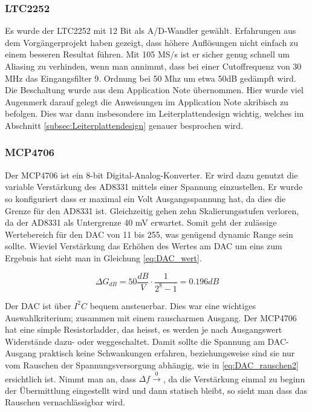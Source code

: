 \subsubsection{LTC2252}
Es wurde der LTC2252\cite{LTC2252} mit 12 Bit als A/D-Wandler gewählt. Erfahrungen aus dem Vorgängerprojekt haben gezeigt, dass höhere Auflösungen nicht einfach zu einem besseren Resultat führen. %
Mit 105 MS/s ist er sicher genug schnell um Aliasing zu verhinden, wenn man annimmt, dass bei einer Cutoffrequenz von 30 MHz das Eingangsfilter 9. Ordnung bei 50 Mhz um etwa 50dB gedämpft wird.
Die Beschaltung wurde aus dem Application Note übernommen. Hier wurde viel Augenmerk darauf gelegt die Anweisungen im Application Note akribisch zu befolgen. Dies war dann insbesondere im Leiterplattendesign wichtig, welches im Abschnitt \ref{subsec:Leiterplattendesign} genauer besprochen wird.

\subsubsection{MCP4706}
\label{subsec:MCP4706}
Der MCP4706\cite{MCP4706} ist ein 8-bit Digital-Analog-Konverter. Er wird dazu genutzt die variable Verstärkung des AD8331 mittels einer Spannung einzustellen. Er wurde so konfiguriert dass er maximal ein Volt Ausgangsspannung hat, da dies die Grenze für den AD8331 ist. Gleichzeitig gehen zehn Skalierungsstufen verloren, da der AD8331 als Untergrenze 40 mV erwartet. Somit geht der zulässige Wertebereich für den DAC von 11 bis 255, was genügend dynamic Range sein sollte. Wieviel Verstärkung das Erhöhen des Wertes am DAC um eins zum Ergebnis hat sieht man in Gleichung \ref{eq:DAC_wert}.

\begin{equation}
    \Delta G_{dB} = 50 \frac{dB}{V} \cdot \frac{1}{2^8 - 1} = 0.196 dB
\label{eq:DAC_wert}
\end{equation}

Der DAC ist über $I^2 C$ bequem ansteuerbar. Dies war eine wichtiges Auswahlkriterium; zusammen mit einem rauscharmen Ausgang. Der MCP4706 hat eine simple Resistorladder, das heisst, es werden je nach Ausgangswert Widerstände dazu- oder weggeschaltet. Damit sollte die Spannung am DAC-Ausgang praktisch keine Schwankungen erfahren, beziehungsweise sind sie nur vom Rauschen der Spannungsversorgung abhängig, wie in \ref{eq:DAC_rauschen2} ersichtlich ist. Nimmt man an, dass $\Delta f \xrightarrow 0$, da die Verstärkung einmal zu beginn der Übermittlung eingestellt wird und dann statisch bleibt, so sieht man dass das Rauschen vernachlässigbar wird.

